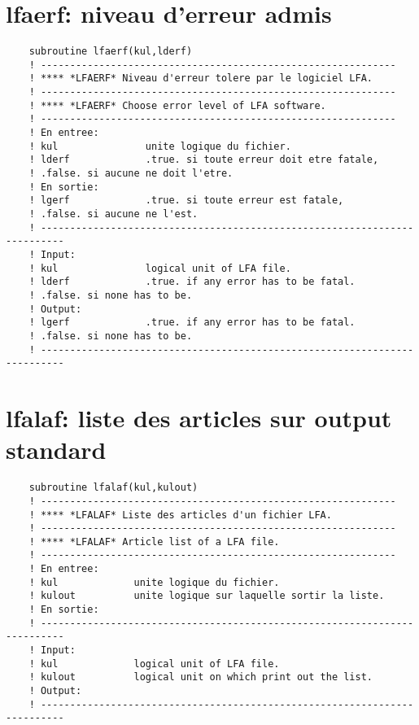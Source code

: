 \documentclass[10pt,french]{book}
\begin{document}
\section{lfaerf: niveau d'erreur admis}
 
 
 
\begin{verbatim}
	subroutine lfaerf(kul,lderf)
	! -------------------------------------------------------------                
	! **** *LFAERF* Niveau d'erreur tolere par le logiciel LFA.
	! -------------------------------------------------------------                
	! **** *LFAERF* Choose error level of LFA software.
	! -------------------------------------------------------------                
	! En entree:
	! kul               unite logique du fichier.
	! lderf             .true. si toute erreur doit etre fatale,
	! .false. si aucune ne doit l'etre.
	! En sortie:
	! lgerf             .true. si toute erreur est fatale,
	! .false. si aucune ne l'est.
	! --------------------------------------------------------------------------
	! Input:
	! kul               logical unit of LFA file.
	! lderf             .true. if any error has to be fatal.
	! .false. si none has to be.
	! Output:
	! lgerf             .true. if any error has to be fatal.
	! .false. si none has to be.
	! --------------------------------------------------------------------------
\end{verbatim}
\section{lfalaf: liste des articles sur output standard}
 
 
 
\begin{verbatim}
	subroutine lfalaf(kul,kulout)
	! -------------------------------------------------------------                
	! **** *LFALAF* Liste des articles d'un fichier LFA.
	! -------------------------------------------------------------                
	! **** *LFALAF* Article list of a LFA file.
	! -------------------------------------------------------------                
	! En entree:
	! kul             unite logique du fichier.
	! kulout          unite logique sur laquelle sortir la liste.
	! En sortie:
	! --------------------------------------------------------------------------
	! Input:
	! kul             logical unit of LFA file.
	! kulout          logical unit on which print out the list.
	! Output:
	! --------------------------------------------------------------------------
\end{verbatim}
\end{document}
